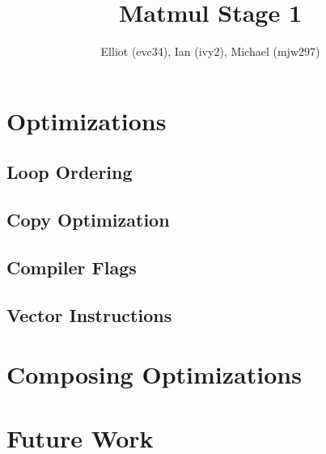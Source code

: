 \documentclass{hw}
\title{Matmul Stage 1}
\author{Elliot (evc34), Ian (ivy2), Michael (mjw297)}
\begin{document}
  \maketitle
  \section{Optimizations}
  \subsection{Loop Ordering}
  \subsection{Copy Optimization}
  \subsection{Compiler Flags}
  \subsection{Vector Instructions}
  \section{Composing Optimizations}
  \section{Future Work}
\end{document}
